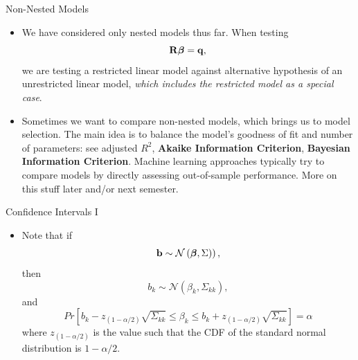 \begin{frame}{Non-Nested Models}
\begin{itemize}
	\item We have considered only nested models thus far. When testing \[
	{\bf R} \boldsymbol{\beta} = {\bf q}, 
	\]
	we are testing a restricted linear model against alternative hypothesis of 
	an unrestricted linear model, \emph{ which includes the restricted model as a special
	case}.

	\medskip
	\item Sometimes we want to compare non-nested models, which brings us to
	model selection. The main idea
	is to balance the model's goodness of fit and number of parameters: see
	adjusted $R^2$, {\bf Akaike Information Criterion}, {\bf Bayesian
	Information Criterion}. Machine learning approaches typically
	try to compare models by directly assessing out-of-sample performance.
	 More on this stuff later and/or next semester.

\end{itemize}
\end{frame}








\begin{frame}{Confidence Intervals I}
\begin{itemize}
	\item Note that if 	\[
		{\bf b} \sim\mathcal{N}\left(\boldsymbol{\beta},\Sigma)\right),
	\]
	then \[
		b_{k} \sim\mathcal{N}\left(\beta_k,\Sigma_{kk}\right),	
	\]
	and \[
	Pr\left[ b_{k} - z_{\left(1-\alpha/2\right)} \sqrt{\Sigma_{kk}} \le \beta_k \le b_k +  z_{\left(1-\alpha/2\right)}  \sqrt{\Sigma_{kk}}  \right] =\alpha 
	\]
	where $ z_{\left(1-\alpha/2\right)} $ is the value such that the CDF of the standard normal distribution is $1-\alpha/2$. 	

\end{itemize}
\end{frame}




